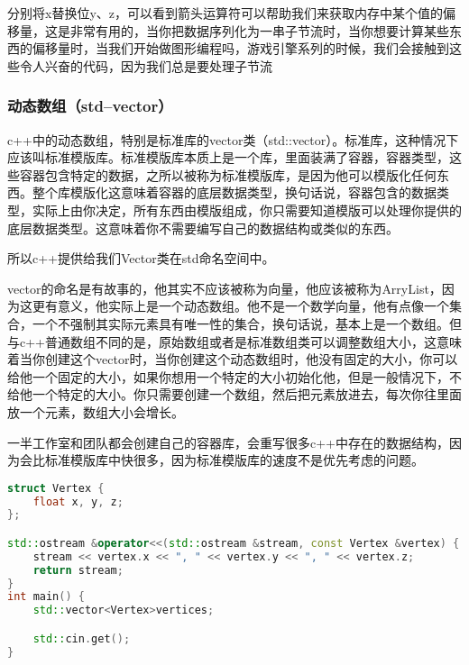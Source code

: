分别将{\ncodestyle x}替换位{\ncodestyle y}、{\ncodestyle z}，可以看到箭头运算符可以帮助我们来获取内存中某个值的偏移量，这是非常有用的，当你把数据序列化为一串子节流时，当你想要计算某些东西的偏移量时，当我们开始做图形编程吗，游戏引擎系列的时候，我们会接触到这些令人兴奋的代码，因为我们总是要处理子节流

\subsubsection{动态数组（std--vector）}

c++中的动态数组，特别是标准库的{\ncodestyle vector}类（{\ncodestyle std::vector}）。标准库，这种情况下应该叫标准模版库。标准模版库本质上是一个库，里面装满了容器，容器类型，这些容器包含特定的数据，之所以被称为标准模版库，是因为他可以模版化任何东西。整个库模版化这意味着容器的底层数据类型，换句话说，容器包含的数据类型，实际上由你决定，所有东西由模版组成，你只需要知道模版可以处理你提供的底层数据类型。这意味着你不需要编写自己的数据结构或类似的东西。

所以c++提供给我们{\ncodestyle Vector}类在{\ncodestyle std}命名空间中。

{\ncodestyle vector}的命名是有故事的，他其实不应该被称为向量，他应该被称为{\ncodestyle ArryList}，因为这更有意义，他实际上是一个动态数组。他不是一个数学向量，他有点像一个集合，一个不强制其实际元素具有唯一性的集合，换句话说，基本上是一个数组。但与c++普通数组不同的是，原始数组或者是标准数组类可以调整数组大小，这意味着当你创建这个{\ncodestyle vector}时，当你创建这个动态数组时，他没有固定的大小，你可以给他一个固定的大小，如果你想用一个特定的大小初始化他，但是一般情况下，不给他一个特定的大小。你只需要创建一个数组，然后把元素放进去，每次你往里面放一个元素，数组大小会增长。

一半工作室和团队都会创建自己的容器库，会重写很多c++中存在的数据结构，因为会比标准模版库中快很多，因为标准模版库的速度不是优先考虑的问题。



\begin{lstlisting}[language=c++]
struct Vertex {
    float x, y, z;
};

std::ostream &operator<<(std::ostream &stream, const Vertex &vertex) {
    stream << vertex.x << ", " << vertex.y << ", " << vertex.z;
    return stream;
}
int main() {
    std::vector<Vertex>vertices;

    std::cin.get();
}
\end{lstlisting}

